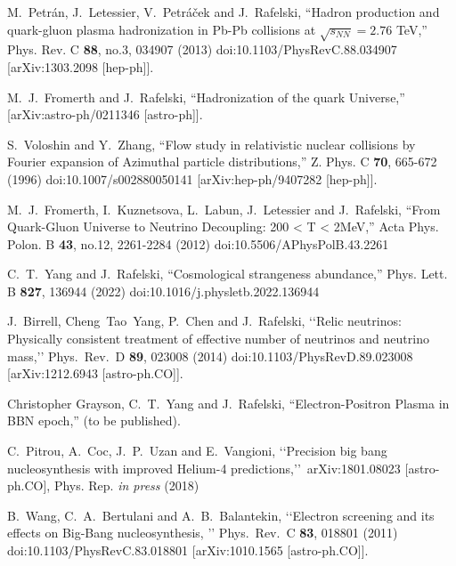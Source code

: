 \documentclass[universe,article,submit,moreauthors,pdftex,a4paper]{Definitions/mdpi}
\begin{document}
\begin{thebibliography}{99}
M.~Petr\'an, J.~Letessier, V.~Petr\'a\v{c}ek and J.~Rafelski,
``Hadron production and quark-gluon plasma hadronization in Pb-Pb collisions at $\sqrt{s_{NN}}=2.76$ TeV,''
Phys. Rev. C \textbf{88}, no.3, 034907 (2013)
doi:10.1103/PhysRevC.88.034907
[arXiv:1303.2098 [hep-ph]].

M.~J.~Fromerth and J.~Rafelski,
``Hadronization of the quark Universe,''
[arXiv:astro-ph/0211346 [astro-ph]].

S.~Voloshin and Y.~Zhang,
``Flow study in relativistic nuclear collisions by Fourier expansion of Azimuthal particle distributions,''
Z. Phys. C \textbf{70}, 665-672 (1996)
doi:10.1007/s002880050141
[arXiv:hep-ph/9407282 [hep-ph]].

M.~J.~Fromerth, I.~Kuznetsova, L.~Labun, J.~Letessier and J.~Rafelski,
``From Quark-Gluon Universe to Neutrino Decoupling: 200 < T < 2MeV,''
Acta Phys. Polon. B \textbf{43}, no.12, 2261-2284 (2012)
doi:10.5506/APhysPolB.43.2261

C.~T.~Yang and J.~Rafelski,
``Cosmological strangeness abundance,''
Phys. Lett. B \textbf{827}, 136944 (2022)
doi:10.1016/j.physletb.2022.136944

J.~Birrell, Cheng~Tao~Yang, P.~Chen and J.~Rafelski,
\lq\lq Relic neutrinos: Physically consistent treatment of effective number of neutrinos and neutrino mass,\rq\rq
Phys.\ Rev.\ D {\bf 89}, 023008 (2014)
doi:10.1103/PhysRevD.89.023008
[arXiv:1212.6943 [astro-ph.CO]].

Christopher Grayson, C.~T.~Yang and J.~Rafelski,
``Electron-Positron Plasma in BBN epoch,'' (to be published).

C.~Pitrou, A.~Coc, J.~P.~Uzan and E.~Vangioni,
\lq\lq Precision big bang nucleosynthesis with improved Helium-4 predictions,\rq\rq\ 
arXiv:1801.08023 [astro-ph.CO], Phys. Rep. {\it in press} (2018)


B.~Wang, C.~A.~Bertulani and A.~B.~Balantekin,
\lq\lq Electron screening and its effects on Big-Bang nucleosynthesis, \rq\rq
Phys.\ Rev.\ C {\bf 83}, 018801 (2011)
doi:10.1103/PhysRevC.83.018801
[arXiv:1010.1565 [astro-ph.CO]].


\end{thebibliography}
\end{document}
